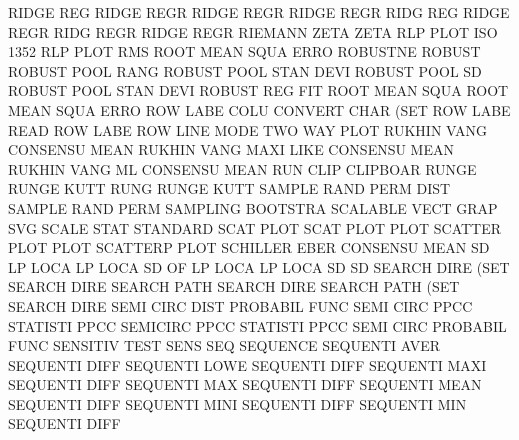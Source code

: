 RIDGE    REG                            RIDGE    REGR
RIDGE    REGR                           RIDGE    REGR
RIDG     REG                            RIDGE    REGR
RIDG     REGR                           RIDGE    REGR
RIEMANN  ZETA                           ZETA
RLP      PLOT                           ISO      1352 RLP  PLOT
RMS                                     ROOT     MEAN SQUA ERRO
ROBUSTNE                                ROBUST
ROBUST   POOL RANG                      ROBUST   POOL STAN DEVI
ROBUST   POOL SD                        ROBUST   POOL STAN DEVI
ROBUST   REG                            FIT
ROOT     MEAN SQUA                      ROOT     MEAN SQUA ERRO
ROW      LABE COLU                      CONVERT  CHAR (SET
ROW      LABE                           READ     ROW  LABE
ROW      LINE MODE                      TWO      WAY  PLOT
RUKHIN   VANG                           CONSENSU MEAN
RUKHIN   VANG MAXI LIKE                 CONSENSU MEAN
RUKHIN   VANG ML                        CONSENSU MEAN
RUN      CLIP                           CLIPBOAR
RUNGE                                   RUNGE    KUTT
RUNG                                    RUNGE    KUTT
SAMPLE   RAND PERM DIST                 SAMPLE   RAND PERM
SAMPLING                                BOOTSTRA
SCALABLE VECT GRAP                      SVG
SCALE    STAT                           STANDARD
SCAT                                    PLOT
SCAT     PLOT                           PLOT
SCATTER  PLOT                           PLOT
SCATTERP                                PLOT
SCHILLER EBER                           CONSENSU MEAN
SD       LP   LOCA                      LP       LOCA
SD       OF   LP   LOCA                 LP       LOCA
SD                                      SD
SEARCH   DIRE (SET                      SEARCH   DIRE
SEARCH   PATH                           SEARCH   DIRE
SEARCH   PATH (SET                      SEARCH   DIRE
SEMI     CIRC DIST                      PROBABIL FUNC
SEMI     CIRC PPCC                      STATISTI PPCC
SEMICIRC PPCC                           STATISTI PPCC
SEMI     CIRC                           PROBABIL FUNC
SENSITIV                                TEST     SENS
SEQ                                     SEQUENCE
SEQUENTI AVER                           SEQUENTI DIFF
SEQUENTI LOWE                           SEQUENTI DIFF
SEQUENTI MAXI                           SEQUENTI DIFF
SEQUENTI MAX                            SEQUENTI DIFF
SEQUENTI MEAN                           SEQUENTI DIFF
SEQUENTI MINI                           SEQUENTI DIFF
SEQUENTI MIN                            SEQUENTI DIFF
